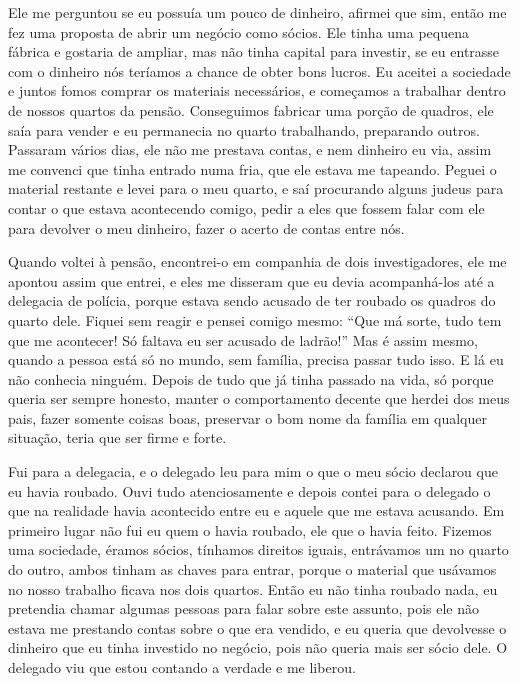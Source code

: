 Ele me perguntou se eu possuía um pouco de dinheiro, afirmei que sim,
então me fez uma proposta de abrir um negócio como sócios. Ele tinha uma
pequena fábrica e gostaria de ampliar, mas não tinha capital para
investir, se eu entrasse com o dinheiro nós teríamos a chance de obter
bons lucros. Eu aceitei a sociedade e juntos fomos comprar os materiais
necessários, e começamos a trabalhar dentro de nossos quartos da pensão.
Conseguimos fabricar uma porção de quadros, ele saía para vender e eu
permanecia no quarto trabalhando, preparando outros. Passaram vários
dias, ele não me prestava contas, e nem dinheiro eu via, assim me
convenci que tinha entrado numa fria, que ele estava me tapeando. Peguei
o material restante e levei para o meu quarto, e saí procurando alguns
judeus para contar o que estava acontecendo comigo, pedir a eles que
fossem falar com ele para devolver o meu dinheiro, fazer o acerto de
contas entre nós.

Quando voltei à pensão, encontrei-o em companhia de dois investigadores,
ele me apontou assim que entrei, e eles me disseram que eu devia
acompanhá-los até a delegacia de polícia, porque estava sendo acusado de
ter roubado os quadros do quarto dele. Fiquei sem reagir e pensei comigo
mesmo: ``Que má sorte, tudo tem que me acontecer! Só faltava eu ser
acusado de ladrão!'' Mas é assim mesmo, quando a pessoa está só no
mundo, sem família, precisa passar tudo isso. E lá eu não conhecia
ninguém. Depois de tudo que já tinha passado na vida, só porque queria
ser sempre honesto, manter o comportamento decente que herdei dos meus
pais, fazer somente coisas boas, preservar o bom nome da família em
qualquer situação, teria que ser firme e forte.

Fui para a delegacia, e o delegado leu para mim o que o meu sócio
declarou que eu havia roubado. Ouvi tudo atenciosamente e depois contei
para o delegado o que na realidade havia acontecido entre eu e aquele
que me estava acusando. Em primeiro lugar não fui eu quem o havia
roubado, ele que o havia feito. Fizemos uma sociedade, éramos sócios,
tínhamos direitos iguais, entrávamos um no quarto do outro, ambos tinham
as chaves para entrar, porque o material que usávamos no nosso trabalho
ficava nos dois quartos. Então eu não tinha roubado nada, eu pretendia
chamar algumas pessoas para falar sobre este assunto, pois ele não
estava me prestando contas sobre o que era vendido, e eu queria que
devolvesse o dinheiro que eu tinha investido no negócio, pois não queria
mais ser sócio dele. O delegado viu que estou contando a verdade e me
liberou.

